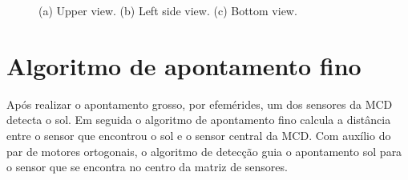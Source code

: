 \documentclass[a4paper,12pt]{article}
\begin{document}
\begin{figure}[h]
	
	\center
	\qquad
	\qquad
	\caption{(a) Upper view. (b) Left side view. (c) Bottom view.}
	
	
\end{figure}
 \newpage
 \section{Algoritmo de apontamento fino}

Após realizar o apontamento grosso, por efemérides, um dos sensores da MCD detecta o sol. Em seguida o algoritmo de apontamento fino calcula a distância entre o sensor que encontrou o sol e o sensor central da MCD. Com auxílio do par de motores ortogonais, o algoritmo de detecção guia o apontamento sol para o sensor que se encontra no centro da matriz de sensores.
\end{document}
